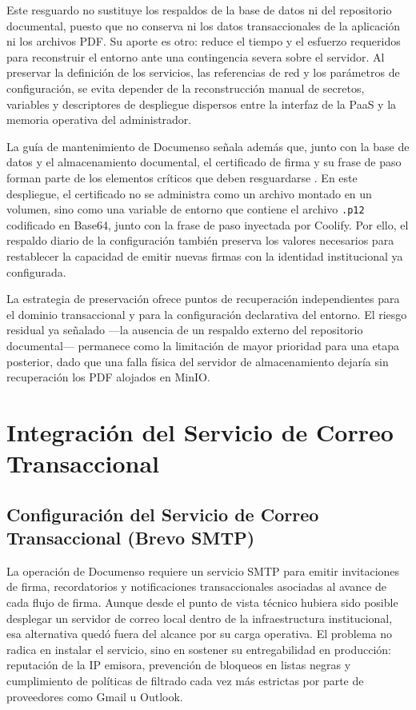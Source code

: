 Este resguardo no sustituye los respaldos de la base de datos ni del repositorio documental, puesto que no conserva ni los datos transaccionales de la aplicación ni los archivos PDF. Su aporte es otro: reduce el tiempo y el esfuerzo requeridos para reconstruir el entorno ante una contingencia severa sobre el servidor. Al preservar la definición de los servicios, las referencias de red y los parámetros de configuración, se evita depender de la reconstrucción manual de secretos, variables y descriptores de despliegue dispersos entre la interfaz de la PaaS y la memoria operativa del administrador.

La guía de mantenimiento de Documenso señala además que, junto con la base de datos y el almacenamiento documental, el certificado de firma y su frase de paso forman parte de los elementos críticos que deben resguardarse \cite{documenso_backups}. En este despliegue, el certificado no se administra como un archivo montado en un volumen, sino como una variable de entorno que contiene el archivo \texttt{.p12} codificado en Base64, junto con la frase de paso inyectada por Coolify. Por ello, el respaldo diario de la configuración también preserva los valores necesarios para restablecer la capacidad de emitir nuevas firmas con la identidad institucional ya configurada.

La estrategia de preservación ofrece puntos de recuperación independientes para el dominio transaccional y para la configuración declarativa del entorno. El riesgo residual ya señalado ---la ausencia de un respaldo externo del repositorio documental--- permanece como la limitación de mayor prioridad para una etapa posterior, dado que una falla física del servidor de almacenamiento dejaría sin recuperación los PDF alojados en MinIO.

\section{Integración del Servicio de Correo Transaccional}

\subsection{Configuración del Servicio de Correo Transaccional (Brevo SMTP)}
\label{subsec:brevo_smtp}

La operación de Documenso requiere un servicio SMTP para emitir invitaciones de firma, recordatorios y notificaciones transaccionales asociadas al avance de cada flujo de firma. Aunque desde el punto de vista técnico hubiera sido posible desplegar un servidor de correo local dentro de la infraestructura institucional, esa alternativa quedó fuera del alcance por su carga operativa. El problema no radica en instalar el servicio, sino en sostener su entregabilidad en producción: reputación de la IP emisora, prevención de bloqueos en listas negras y cumplimiento de políticas de filtrado cada vez más estrictas por parte de proveedores como Gmail u Outlook.

